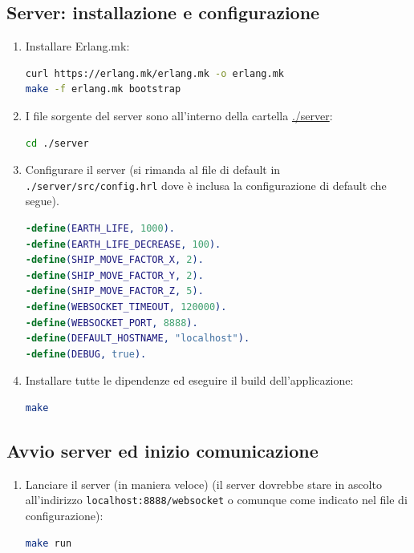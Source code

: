 \documentclass[paper=a4, fontsize=11pt]{scrartcl} %
\numberwithin{equation}{section} %
\numberwithin{figure}{section} %
\numberwithin{table}{section} %
\begin{document}
\subsection{Server: installazione e configurazione}
\begin{enumerate}
\item
Installare Erlang.mk:
\begin{lstlisting}[language=bash]
curl https://erlang.mk/erlang.mk -o erlang.mk
make -f erlang.mk bootstrap
\end{lstlisting}

\item
I file sorgente del server sono all'interno della cartella \url{./server}:
\begin{lstlisting}[language=bash]
cd ./server
\end{lstlisting}

\item
Configurare il server (si rimanda al file di default in \texttt{./server/src/config.hrl} dove è inclusa la configurazione di default che segue).
\begin{lstlisting}[language=erlang]
-define(EARTH_LIFE, 1000).
-define(EARTH_LIFE_DECREASE, 100).
-define(SHIP_MOVE_FACTOR_X, 2).
-define(SHIP_MOVE_FACTOR_Y, 2).
-define(SHIP_MOVE_FACTOR_Z, 5).
-define(WEBSOCKET_TIMEOUT, 120000).
-define(WEBSOCKET_PORT, 8888).
-define(DEFAULT_HOSTNAME, "localhost").
-define(DEBUG, true).

\end{lstlisting}

\item
Installare tutte le dipendenze ed eseguire il build dell'applicazione:
\begin{lstlisting}[language=bash]
make
\end{lstlisting}
\end{enumerate}
\subsection{Avvio server ed inizio comunicazione}
\begin{enumerate}
\item
Lanciare il server (in maniera veloce) (il server dovrebbe stare in ascolto all'indirizzo \texttt{localhost:8888/websocket} o comunque come indicato nel file di configurazione):
\begin{lstlisting}[language=bash]
make run
\end{lstlisting}
\end{enumerate}
\end{document}
